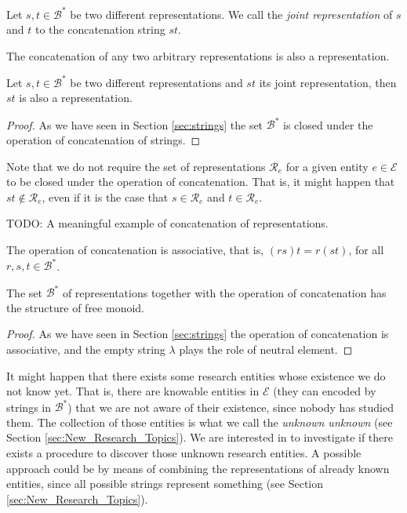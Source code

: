 \begin{definition}
Let $s, t \in \mathcal{B}^\ast$ be two different representations. We call the \emph{joint representation} of $s$ and $t$ to the concatenation string $st$.
\end{definition}

The concatenation of any two arbitrary representations is also a representation.

\begin{proposition}
Let $s, t \in \mathcal{B}^\ast$ be two different representations and $st$ its joint representation, then $st$ is also a representation.
\end{proposition}
\begin{proof}
As we have seen in Section \ref{sec:strings} the set $\mathcal{B}^\ast$ is closed under the operation of concatenation of strings.
\end{proof}

Note that we do not require the set of representations $\mathcal{R}_e$ for a given entity $e \in \mathcal{E}$ to be closed under the operation of concatenation. That is, it might happen that $st \notin \mathcal{R}_e$, even if it is the case that $s \in \mathcal{R}_e$ and $t \in \mathcal{R}_e$.

\begin{example}
{\color{red} TODO: A meaningful example of concatenation of representations.}
\end{example}

The operation of concatenation is associative, that is, $(rs)t = r(st)$, for all $r, s, t \in \mathcal{B}^\ast$.

\begin{proposition}
The set $\mathcal{B}^\ast$ of representations together with the operation of concatenation has the structure of free monoid.
\end{proposition}
\begin{proof}
As we have seen in Section \ref{sec:strings} the operation of concatenation is associative, and the empty string $\lambda$ plays the role of neutral element.
\end{proof}

It might happen that there exists some research entities whose existence we do not know yet. That is, there are knowable entities in $\mathcal{E}$ (they can encoded by strings in $\mathcal{B}^\ast$) that we are not aware of their existence, since nobody has studied them. The collection of those entities is what we call the \emph{unknown unknown} (see Section \ref{sec:New_Research_Topics}). We are interested in to investigate if there exists a procedure to discover those unknown research entities. A possible approach could be by means of combining the representations of already known entities, since all possible strings represent something (see Section \ref{sec:New_Research_Topics}).

